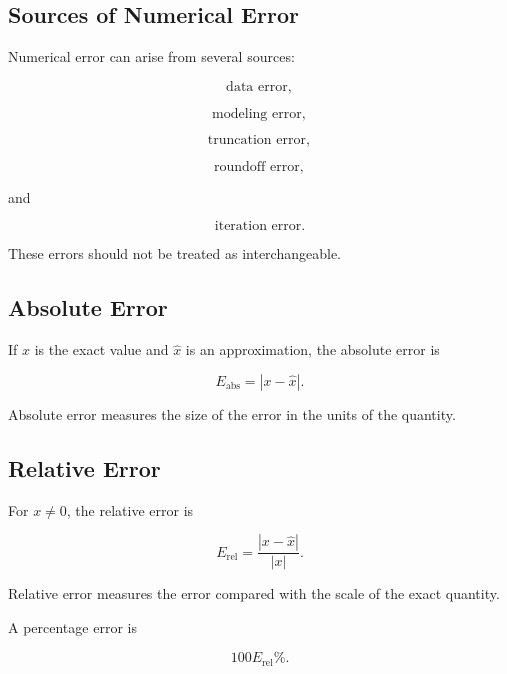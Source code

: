 \subsection{Sources of Numerical Error}
\label{subsec:sources-numerical-error}

Numerical error can arise from several sources:

\[
\boxed{
\text{data error},
}
\]

\[
\boxed{
\text{modeling error},
}
\]

\[
\boxed{
\text{truncation error},
}
\]

\[
\boxed{
\text{roundoff error},
}
\]

and

\[
\boxed{
\text{iteration error}.
}
\]

These errors should not be treated as interchangeable.

\subsection{Absolute Error}
\label{subsec:absolute-error-numerical}

If \(x\) is the exact value and \(\widehat{x}\) is an approximation, the
absolute error is

\[
\boxed{
E_{\mathrm{abs}}
=
|x-\widehat{x}|.
}
\]

Absolute error measures the size of the error in the units of the
quantity.

\subsection{Relative Error}
\label{subsec:relative-error-numerical}

For \(x\neq0\), the relative error is

\[
\boxed{
E_{\mathrm{rel}}
=
\frac{
|x-\widehat{x}|
}{
|x|
}.
}
\]

Relative error measures the error compared with the scale of the exact
quantity.

A percentage error is

\[
\boxed{
100E_{\mathrm{rel}}\%.
}
\]

